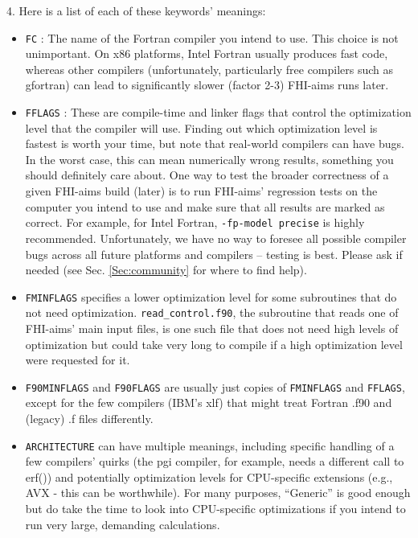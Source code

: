4. Here is a list of each of these keywords' meanings:
\begin{itemize}
  \item \texttt{FC} : The name of the Fortran compiler you intend to
    use. This choice is not unimportant. On x86 platforms, Intel
    Fortran usually produces fast code, whereas other compilers
    (unfortunately, particularly free compilers such as gfortran) can
    lead to significantly slower (factor 2-3) FHI-aims runs
    later.
  \item \texttt{FFLAGS} : These are compile-time and linker flags that
    control the optimization level that the compiler will use. Finding
    out which optimization level is fastest is worth your time, but
    note that real-world compilers can have bugs. In the worst case,
    this can mean numerically wrong results, something you should
    definitely care about. One way to test the broader correctness of a given
    FHI-aims build (later) is to run FHI-aims' regression tests on the
    computer you intend to use and make sure that all results are
    marked as correct. For example,
    for Intel Fortran, 
    \texttt{-fp-model precise} is highly recommended. Unfortunately,
    we have no way to foresee all possible compiler bugs across all
    future platforms and compilers -- testing is best. Please ask if
    needed (see Sec. \ref{Sec:community} for where to find help).
  \item \texttt{FMINFLAGS} specifies a lower optimization level for
    some subroutines that do not need
    optimization. \texttt{read\_control.f90}, the subroutine that
    reads one of FHI-aims' main input files, is one such file that
    does not need high levels of optimization but could take very long
    to compile if a high optimization level were requested for it.
  \item \texttt{F90MINFLAGS} and \texttt{F90FLAGS} are usually just
    copies of \texttt{FMINFLAGS} and \texttt{FFLAGS}, except for the
    few compilers (IBM's xlf) that might treat Fortran .f90 and
    (legacy) .f files differently.
  \item \texttt{ARCHITECTURE} can have multiple meanings, including
    specific handling of a few compilers' quirks (the pgi compiler,
    for example, needs a different call to erf()) and potentially
    optimization levels for CPU-specific extensions (e.g., AVX - this
    can be worthwhile). For many purposes, ``Generic'' is good enough
    but do take the time to look into CPU-specific optimizations if
    you intend to run very large, demanding calculations.

\end{itemize}
